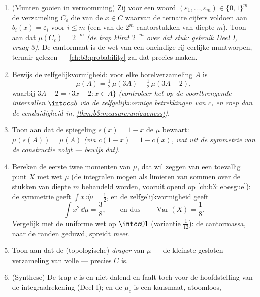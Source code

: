 \begin{problem}
\begin{enumerate}[resume]
        .
  \item (Munten gooien in vermomming) Zij voor een woord
        $(\varepsilon_1, \dots, \varepsilon_m) \in \{0,1\}^m$ de
        verzameling $C_{\varepsilon}$ die van de $x \in C$ waarvan
        de ternaire cijfers voldoen aan $b_i(x) = \varepsilon_i$
        voor $i \leq m$ (een van de $2^m$ cantorstukken van diepte
        $m$). Toon aan dat $\mu(C_\varepsilon) = 2^{-m}$ \emph{(de
        trap klimt $2^{-m}$ over dat stuk: gebruik Deel I, vraag
        3)}. De cantormaat is de wet van een oneindige rij eerlijke
        muntworpen, ternair gelezen --- \cref{ch:b3:probability}
        zal dat precies maken.
  \item Bewijs de zelfgelijkvormigheid: voor elke borelverzameling
        $A$ is
        \[
        \mu(A) = \tfrac12\,\mu(3A) +
        \tfrac12\,\mu(3A - 2) ,
        \]
        waarbij $3A - 2 = \{3x - 2 : x \in A\}$ \emph{(controleer
        het op de voortbrengende intervallen $\intoc ab$ via de
        zelfgelijkvormige betrekkingen van $c$, en roep dan de
        eenduidigheid in, \cref{thm:b3:measure:uniqueness})}.
  \item Toon aan dat de spiegeling $s(x) = 1 - x$ de  $\mu$
        bewaart: $\mu(s(A)) = \mu(A)$ \emph{(via $c(1 - x) = 1 -
        c(x)$, wat uit de symmetrie van de constructie volgt ---
        bewijs dat)}.
  \item Bereken de eerste twee momenten van $\mu$, dat wil zeggen
        van een toevallig punt $X$ met wet $\mu$ (de integralen
        mogen als limieten van sommen over de stukken van diepte
        $m$ behandeld worden, vooruitlopend op
        \cref{ch:b3:lebesgue}): de symmetrie geeft $\int x\,\dd\mu
        = \frac12$, en de zelfgelijkvormigheid geeft
        \[
        \int x^2\,\dd\mu = \frac38,
        \qquad\text{en dus}\qquad
        \operatorname{Var}(X) = \frac18 .
        \]
        Vergelijk met de uniforme wet op $\intcc01$ (variantie
        $\frac1{12}$): de cantormassa, naar de randen geduwd,
        spreidt \emph{meer}.
  \item Toon aan dat de (topologische) \emph{drager} van $\mu$ ---
        de kleinste gesloten verzameling van volle  --- precies
        $C$ is.
  \item (Synthese) De trap $c$ is  en niet-dalend en faalt
        toch voor de hoofdstelling van de integraalrekening (Deel
        I); en de  $\mu_c$ is een kansmaat, atoomloos,

\end{enumerate}
\end{problem}
